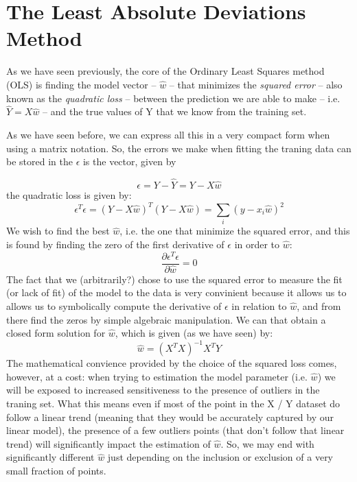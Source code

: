 \section{The Least Absolute Deviations Method}

As we have seen previously, the core of the Ordinary Least Squares method (OLS) is finding the model vector -- $\hat{w}$ -- that minimizes the \emph{squared error} -- also known as the \emph{quadratic loss} -- between the prediction we are able to make -- i.e. $\hat{Y} = X\hat{w}$ -- and the true values of Y that we know from the training set. 

As we have seen before, we can express all this in a very compact form when using a matrix notation. So,  the errors we make when fitting the traning data can be stored in the $\epsilon$ is the vector, given by

\begin{equation}
\epsilon = Y - \hat{Y} = Y - X \hat{w} 
\end{equation}
the quadratic loss is given by:
\begin{equation}
\epsilon^T \epsilon = (Y - X \hat{w})^{T}(Y - X \hat{w}) = \sum_i (y - x_i \hat{w})^2
\end{equation}
We wish to find the best $\hat{w}$, i.e. the one that minimize the squared error, and this is found by finding the zero of the first derivative of $\epsilon$ in order to $\hat{w}$:
\begin{equation}
\frac{\partial \epsilon^T \epsilon}{\partial \hat{w}} = 0
\end{equation}
The fact that we (arbitrarily?) chose to use the squared error to measure the fit (or lack of fit) of the model to the data is very convinient because it allows us to allows us to symbolically compute the derivative of $\epsilon$ in relation to $\hat{w}$, and from there find the zeros by simple algebraic manipulation. We can that obtain a closed form solution for $\hat{w}$, which is given (as we have seen) by:
\begin{equation}
\hat{w} = (X^T X)^{-1} X^T Y
\end{equation}
The mathematical convience provided by the choice of the squared loss comes, however, at a cost: when trying to estimation the model parameter (i.e. $\hat{w}$) we will be exposed to increased sensitiveness to the presence of outliers in the traning set. What this means even if most of the point in the X / Y dataset do follow a linear trend (meaning that they would be accurately captured by our linear model), the presence of a few outliers points (that don't follow that linear trend) will significantly impact the estimation of $\hat{w}$. So, we may end with significantly different $\hat{w}$ just depending on the inclusion or exclusion of a very small fraction of points. 


